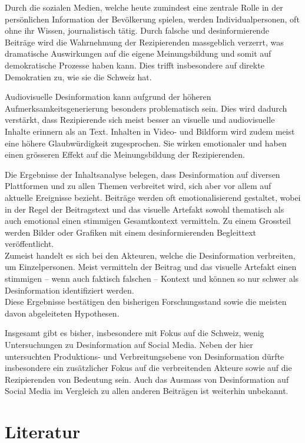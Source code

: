 \documentclass[12pt,a4paper]{article}        %
\begin{document}
Durch die sozialen Medien, welche heute zumindest eine zentrale Rolle in der persönlichen Information der Bevölkerung spielen, werden Individualpersonen, oft ohne ihr Wissen, journalistisch tätig. Durch falsche und desinformierende Beiträge wird die Wahrnehmung der Rezipierenden massgeblich verzerrt, was dramatische Auswirkungen auf die eigene Meinungsbildung und somit auf demokratische Prozesse haben kann. Dies trifft insbesondere auf direkte Demokratien zu, wie sie die Schweiz hat.

Audiovisuelle Desinformation kann aufgrund der höheren Aufmerksamkeitsgenerierung besonders problematisch sein. Dies wird dadurch verstärkt, dass Rezipierende sich meist besser an visuelle und audiovisuelle Inhalte erinnern als an Text. Inhalten in Video- und Bildform wird zudem meist eine höhere Glaubwürdigkeit zugesprochen. Sie wirken emotionaler und haben einen grösseren Effekt auf die Meinungsbildung der Rezipierenden.

Die Ergebnisse der Inhaltsanalyse belegen, dass Desinformation auf diversen Plattformen und zu allen Themen verbreitet wird, sich aber vor allem auf aktuelle Ereignisse bezieht. Beiträge werden oft emotionalisierend gestaltet, wobei in der Regel der Beitragstext und das visuelle Artefakt sowohl thematisch als auch emotional einen stimmigen Gesamtkontext vermitteln. Zu einem Grossteil werden Bilder oder Grafiken mit einem desinformierenden Begleittext veröffentlicht.\\
Zumeist handelt es sich bei den Akteuren, welche die Desinformation verbreiten, um Einzelpersonen. Meist vermitteln der Beitrag und das visuelle Artefakt einen stimmigen – wenn auch faktisch falschen – Kontext und können so nur schwer als Desinformation identifiziert werden.\\
Diese Ergebnisse bestätigen den bisherigen Forschungsstand sowie die meisten davon abgeleiteten Hypothesen.

Insgesamt gibt es bisher, insbesondere mit Fokus auf die Schweiz, wenig Untersuchungen zu Desinformation auf Social Media. Neben der hier untersuchten Produktions- und Verbreitungsebene von Desinformation dürfte insbesondere ein zusätzlicher Fokus auf die verbreitenden Akteure sowie auf die Rezipierenden von Bedeutung sein. Auch das Ausmass von Desinformation auf Social Media im Vergleich zu allen anderen Beiträgen ist weiterhin unbekannt.

\pagebreak
\section{Literatur}
\printbibliography[heading=none, nottype=artwork]
\pagebreak
\end{document}
